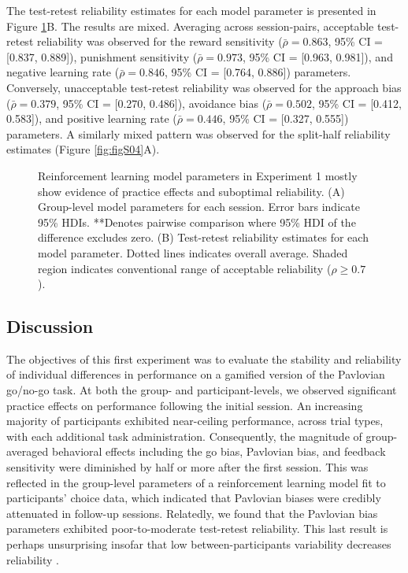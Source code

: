 \documentclass[a4paper,12pt]{article}
\begin{document}
\begin{refsection}[main]
The test-retest reliability estimates for each model parameter is presented in Figure \ref{fig:exp01_modeling}B. The results are mixed. Averaging across session-pairs, acceptable test-retest reliability was observed for the reward sensitivity ($\bar{\rho} = 0.863$, 95\% CI = [0.837, 0.889]), punishment sensitivity ($\bar{\rho} = 0.973$, 95\% CI = [0.963, 0.981]), and negative learning rate ($\bar{\rho} = 0.846$, 95\% CI = [0.764, 0.886]) parameters. Conversely, unacceptable test-retest reliability was observed for the approach bias ($\bar{\rho} = 0.379$, 95\% CI = [0.270, 0.486]), avoidance bias ($\bar{\rho} = 0.502$, 95\% CI = [0.412, 0.583]), and positive learning rate ($\bar{\rho} = 0.446$, 95\% CI = [0.327, 0.555]) parameters. A similarly mixed pattern was observed for the split-half reliability estimates (Figure \ref{fig:figS04}A).

\begin{figure}[t!]
    \centerline{}
    \caption{Reinforcement learning model parameters in Experiment 1 mostly show evidence of practice effects and suboptimal reliability. (A) Group-level model parameters for each session. Error bars indicate 95\% HDIs. **Denotes pairwise comparison where 95\% HDI of the difference excludes zero. (B) Test-retest reliability estimates for each model parameter. Dotted lines indicates overall average. Shaded region indicates conventional range of acceptable reliability ($\rho \geq 0.7$).}
    \label{fig:exp01_modeling}
\end{figure}

\subsection*{Discussion}

The objectives of this first experiment was to evaluate the stability and reliability of individual differences in performance on a gamified version of the Pavlovian go/no-go task. At both the group- and participant-levels, we observed significant practice effects on performance following the initial session. An increasing majority of participants exhibited near-ceiling performance, across trial types, with each additional task administration. Consequently, the magnitude of group-averaged behavioral effects including the go bias, Pavlovian bias, and feedback sensitivity were diminished by half or more after the first session. This was reflected in the group-level parameters of a reinforcement learning model fit to participants' choice data, which indicated that Pavlovian biases were credibly attenuated in follow-up sessions. Relatedly, we found that the Pavlovian bias parameters exhibited poor-to-moderate test-retest reliability. This last result is perhaps unsurprising insofar that low between-participants variability decreases reliability \cite{zorowitz2023improving}.  


\end{refsection}
\end{document}
